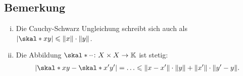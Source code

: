 \subsection[Bemerkungen über Cauchy-Schwarz und die Stetigkeit von $\skal*{\cdot}{\cdot}$]{Bemerkung} %
\label{sub:76}
\begin{enumerate}[(i)]
	\item Die Cauchy-Schwarz Ungleichung schreibt sich auch als $\abs*{\skal*{x}{y}} \le \norm{x} \cdot \norm{y}$.
	\item Die Abbildung $\skal*{\cdot}{\cdot} \colon X \times X \to \mathds{K}$ ist stetig:
	\begin{align*}
		\abs*{\skal*{x}{y}- \skal*{x'}{y'}} = \ldots \le \norm{x-x'} \cdot \norm{y} + \norm{x'} \cdot \norm{y'-y}.     
	\end{align*}
\end{enumerate}


